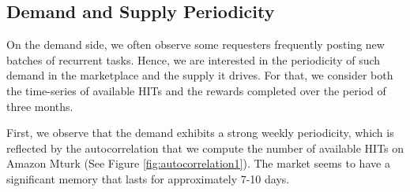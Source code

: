 \subsection{Demand and Supply Periodicity}
On the demand side, we often observe some requesters frequently posting new batches of recurrent tasks. Hence, we are interested in the periodicity of such demand in the marketplace and the supply it drives. For that, we consider both the time-series of available HITs and the rewards completed over the period of three months. 

First, we observe that the demand exhibits a strong weekly periodicity, which is reflected by the autocorrelation that we compute the number of available HITs on Amazon Mturk (See Figure \ref{fig:autocorrelation1}). The market seems to have a significant memory that lasts for approximately 7-10 days.

